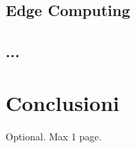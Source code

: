 \documentclass[12pt,a4paper,openright,twoside]{book}
\begin{document}
\section{Edge Computing}

\section{...}

\chapter{Conclusioni}
\label{chap:conclusions}


\backmatter

\nocite{*} %




\begin{acknowledgements} %
Optional. Max 1 page.
\end{acknowledgements}
\end{document}
